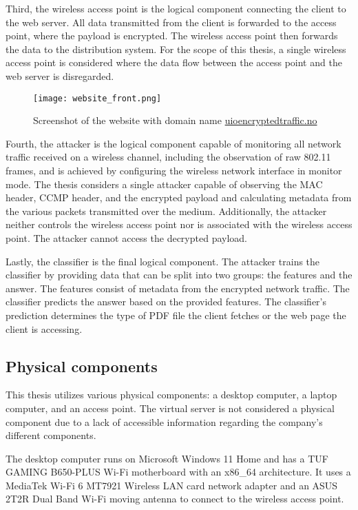 Third, the wireless access point is the logical component connecting the client to the web server. All data transmitted from the client is forwarded to the access point, where the payload is encrypted. The wireless access point then forwards the data to the distribution system. For the scope of this thesis, a single wireless access point is considered where the data flow between the access point and the web server is disregarded.

\begin{figure}
	\centering
        \texttt{[image: website\_front.png]}
           \caption{Screenshot of the website with domain name \url{uioencryptedtraffic.no}}
    \label{fig:website-front}
\end{figure}

Fourth, the attacker is the logical component capable of monitoring all network traffic received on a wireless channel, including the observation of raw 802.11 frames, and is achieved by configuring the wireless network interface in monitor mode. The thesis considers a single attacker capable of observing the MAC header, CCMP header, and the encrypted payload and calculating metadata from the various packets transmitted over the medium. Additionally, the attacker neither controls the wireless access point nor is associated with the wireless access point. The attacker cannot access the decrypted payload.

Lastly, the classifier is the final logical component. The attacker trains the classifier by providing data that can be split into two groups: the features and the answer. The features consist of metadata from the encrypted network traffic. The classifier predicts the answer based on the provided features. The classifier's prediction determines the type of PDF file the client fetches or the web page the client is accessing. 

\subsection{Physical components\label{subsec:physical-methodology}}

This thesis utilizes various physical components: a desktop computer, a laptop computer, and an access point. The virtual server is not considered a physical component due to a lack of accessible information regarding the company's different components.

The desktop computer runs on Microsoft Windows 11 Home and has a TUF GAMING B650-PLUS Wi-Fi motherboard with an x86_64 architecture. It uses a MediaTek Wi-Fi 6 MT7921 Wireless LAN card network adapter and an ASUS 2T2R Dual Band Wi-Fi moving antenna to connect to the wireless access point.


